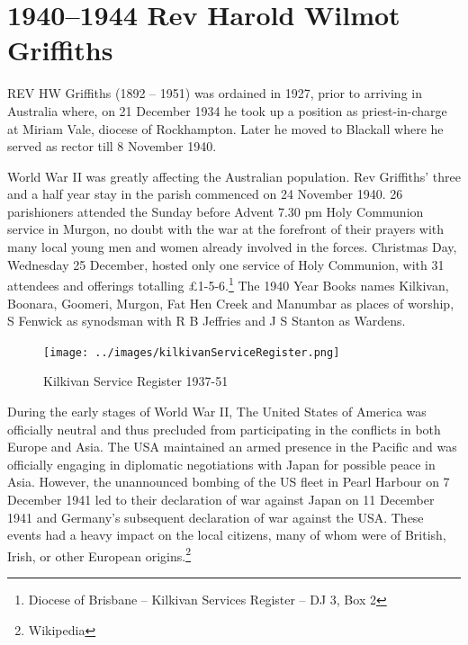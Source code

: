 \printendnotes[custom]
\setcounter{endnote}{0}
\chapter{1940--1944 Rev Harold Wilmot Griffiths}
\nobalance


\lettrine[lines=3]{R}{EV}
 HW Griffiths (1892 -- 1951) was ordained in 1927, prior to arriving in Australia where, on 21 December 1934 he took up a position as priest-in-charge at Miriam Vale, diocese of Rockhampton. Later he moved to Blackall where he served as rector till 8 November 1940.

World War II was greatly affecting the Australian population. Rev Griffiths' three and a half year stay in the parish commenced on 24 November 1940. 26 parishioners attended the Sunday before Advent 7.30 pm Holy Communion service in Murgon, no doubt with the war at the forefront of their prayers with many local young men and women already involved in the forces. Christmas Day, Wednesday 25 December, hosted only one service of Holy Communion, with 31 attendees and offerings totalling \pounds1-5-6.\footnote{Diocese of Brisbane -- Kilkivan Services Register -- DJ 3, Box 2} The 1940 Year Books names Kilkivan, Boonara, Goomeri, Murgon, Fat Hen Creek and Manumbar as places of worship, S Fenwick as synodsman with R B Jeffries and J S Stanton as Wardens.








\begin{figure}
\begin{center}
\texttt{[image: ../images/kilkivanServiceRegister.png]}
\caption{Kilkivan Service Register 1937-51}
\end{center}
\end{figure}




During the early stages of World War II, The United States of America was officially neutral and thus precluded from participating in the conflicts in both Europe and Asia. The USA maintained an armed presence in the Pacific and was officially engaging in diplomatic negotiations with Japan for possible peace in Asia. However, the unannounced bombing of the US fleet in Pearl Harbour on 7 December 1941 led to their declaration of war against Japan on 11 December 1941 and Germany's subsequent declaration of war against the USA. These events had a heavy impact on the local citizens, many of whom were of British, Irish, or other European origins.\footnote{Wikipedia}



